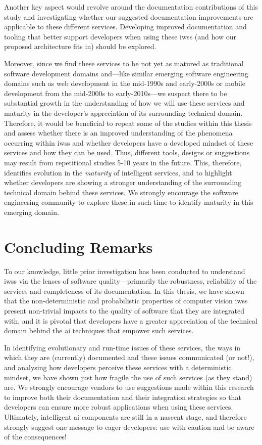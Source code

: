 Another key aspect would revolve around the documentation contributions of this study and investigating whether our suggested documentation improvements are applicable to these different services. Developing improved documentation and tooling that better support developers when using these \glspl{iws} (and how our proposed architecture fits in) should be explored. 

Moreover, since we find these services to be not yet as matured as traditional software development domains and---like similar emerging software engineering domains such as web development in the mid-1990s and early-2000s or mobile development from the mid-2000s to early-2010s---we suspect there to be substantial growth in the understanding of how we will use these services and maturity in the developer's appreciation of its surrounding technical domain. Therefore, it would be beneficial to repeat some of the studies within this thesis and assess whether there is an improved understanding of the phenomena occurring within \glspl{iws} and whether developers have a developed mindset of these services and how they can be used. Thus, different tools, designs or suggestions may result from repetitional studies 5-10 years in the future. This, therefore, identifies evolution in the \textit{maturity} of intelligent services, and to highlight whether developers are showing a stronger understanding of the surrounding technical domain behind these services. We strongly encourage the software engineering community to explore these in such time to identify maturity in this emerging domain.


\section{Concluding Remarks}

To our knowledge, little prior investigation has been conducted to understand \glspl{iws} via the lenses of software quality---primarily the robustness, reliability of the services and completeness of its documentation. In this thesis, we have shown that the non-deterministic and probabilistic properties of computer vision \glspl{iws} present non-trivial impacts to the quality of software that they are integrated with, and it is pivotal that developers have a greater appreciation of the technical domain behind the \gls{ai} techniques that empower such services. 

In identifying evolutionary and run-time issues of these services, the ways in which they are (currently) documented and these issues communicated (or not!), and analysing how developers perceive these services with a deterministic mindset, we have shown just how fragile the use of such services (as they stand) are. We strongly encourage vendors to use suggestions made within this research to improve both their documentation and their integration strategies so that developers can ensure more robust applications when using these services. Ultimately, intelligent \gls{ai} components are still in a nascent stage, and therefore strongly suggest one message to eager developers: use with caution and be aware of the consequences!


